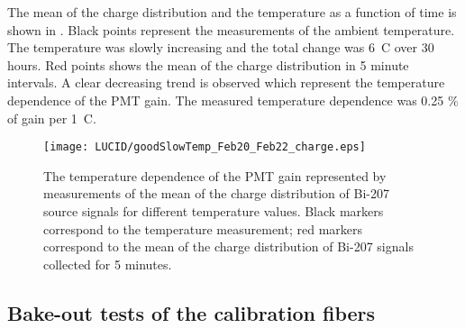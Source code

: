 The mean of the charge distribution and the temperature as a function of time is shown in .
Black points represent the measurements of the ambient temperature. The temperature was slowly increasing and the total change was 6\degree~C over 30 hours.
Red points shows the mean of the charge distribution in 5 minute intervals.
A clear decreasing trend is observed which represent the temperature dependence of the PMT gain.
The measured temperature dependence was 0.25 $\%$ of gain per 1\degree~C. 

\begin{figure}
\centering
\texttt{[image: LUCID/goodSlowTemp\_Feb20\_Feb22\_charge.eps]}
\caption{The temperature dependence of the PMT gain represented by measurements of the mean of the charge distribution of Bi-207 source signals 
for different temperature values.
Black markers correspond to the temperature measurement; red markers correspond to the mean of the charge distribution of Bi-207 signals collected for 5 minutes.}
\label{fig:PMTChargeTempDep}
\end{figure}

\subsection{Bake-out tests of the calibration fibers}
% 
% 
% 

